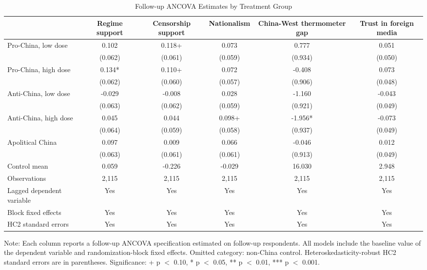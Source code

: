 \begin{table}[H]
\centering
\caption{Follow-up ANCOVA Estimates by Treatment Group}
\label{tab:main_ancova_t2}
\footnotesize
\begin{threeparttable}
\begin{tabular}{lccccc}
\toprule
 & Regime support & Censorship support & Nationalism & China-West thermometer gap & Trust in foreign media \\
\midrule
Pro-China, low dose & 0.102 & 0.118+ & 0.073 & 0.777 & 0.051 \\
 & (0.062) & (0.061) & (0.059) & (0.934) & (0.050) \\
\addlinespace
Pro-China, high dose & 0.134* & 0.110+ & 0.072 & -0.408 & 0.073 \\
 & (0.062) & (0.060) & (0.057) & (0.906) & (0.048) \\
\addlinespace
Anti-China, low dose & -0.029 & -0.008 & 0.028 & -1.160 & -0.043 \\
 & (0.063) & (0.062) & (0.059) & (0.921) & (0.049) \\
\addlinespace
Anti-China, high dose & 0.045 & 0.044 & 0.098+ & -1.956* & -0.073 \\
 & (0.064) & (0.059) & (0.058) & (0.937) & (0.049) \\
\addlinespace
Apolitical China & 0.097 & 0.009 & 0.066 & -0.046 & 0.012 \\
 & (0.063) & (0.061) & (0.061) & (0.913) & (0.049) \\
\addlinespace
\midrule
Control mean & 0.059 & -0.226 & -0.029 & 16.030 & 2.948 \\
Observations & 2,115 & 2,115 & 2,115 & 2,115 & 2,115 \\
Lagged dependent variable & Yes & Yes & Yes & Yes & Yes \\
Block fixed effects & Yes & Yes & Yes & Yes & Yes \\
HC2 standard errors & Yes & Yes & Yes & Yes & Yes \\
\bottomrule
\end{tabular}
\begin{tablenotes}[flushleft]
\footnotesize
\item Note: Each column reports a follow-up ANCOVA specification estimated on follow-up respondents. All models include the baseline value of the dependent variable and randomization-block fixed effects. Omitted category: non-China control. Heteroskedasticity-robust HC2 standard errors are in parentheses. Significance: + p $<$ 0.10, * p $<$ 0.05, ** p $<$ 0.01, *** p $<$ 0.001.
\end{tablenotes}
\end{threeparttable}
\end{table}
